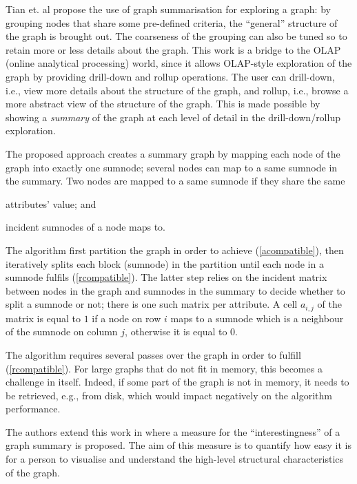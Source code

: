 Tian et. al \cite{tian:sigmod:2008} propose the use of graph summarisation for exploring a graph: by grouping nodes that share some pre-defined criteria, the ``general'' structure of the graph is brought out. The coarseness of the grouping can also be tuned so to retain more or less details about the graph. This work is a bridge to the OLAP (online analytical processing) world, since it allows OLAP-style exploration of the graph by providing drill-down and rollup operations. The user can drill-down, i.e., view more details about the structure of the graph, and rollup, i.e., browse a more abstract view of the structure of the graph. This is made possible by showing a \emph{summary} of the graph at each level of detail in the drill-down/rollup exploration.

The proposed approach creates a summary graph by mapping each node of the graph into exactly one sumnode; several nodes can map to a same sumnode in the summary. Two nodes are mapped to a same sumnode if they share the same
\begin{inparaenum}[(a)]
	\item attributes' value; and
	\label{acompatible}
	\item incident sumnodes of a node maps to.
	\label{rcompatible}
\end{inparaenum}
The algorithm first partition the graph in order to achieve (\ref{acompatible}), then iteratively splits each block (sumnode) in the partition until each node in a sumnode fulfils (\ref{rcompatible}). The latter step relies on the incident matrix between nodes in the graph and sumnodes in the summary to decide whether to split a sumnode or not; there is one such matrix per attribute. A cell $a_{i,j}$ of the matrix is equal to $1$ if a node on row $i$ maps to a sumnode which is a neighbour of the sumnode on column $j$, otherwise it is equal to $0$.

The algorithm requires several passes over the graph in order to fulfill (\ref{rcompatible}). For large graphs that do not fit in memory, this becomes a challenge in itself. Indeed, if some part of the graph is not in memory, it needs to be retrieved, e.g., from disk, which would impact negatively on the algorithm performance.

The authors extend this work in \cite{zhang:2010:ddg} where a measure for the ``interestingness'' of a graph summary is proposed. The aim of this measure is to quantify how easy it is for a person to visualise and understand the high-level structural characteristics of the graph. 

